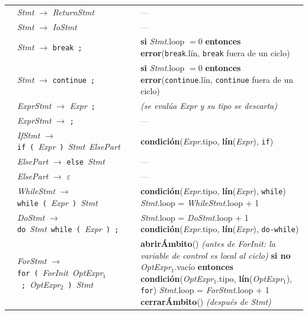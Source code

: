 \documentclass[11pt]{article}
\newcommand{\NT}[1]{\textcolor{ntcolor}{\textit{#1}}}            %
\newcommand{\T}[1]{\textcolor{tcolor}{\texttt{#1}}}              %
\newcommand{\A}[2]{\NT{#1}.\textsf{#2}}                          %
\newcommand{\Ax}[3]{\NT{#1}$_{#2}$.\textsf{#3}}                  %
\newcommand{\fn}[1]{\textsf{\textbf{#1}}}                        %
\newcommand{\kw}[1]{\textbf{#1}}                                 %
\begin{document}
{\begin{longtable}{@{}r@{\hspace{6pt}}>{\raggedright\arraybackslash}p{5.6cm}@{\hspace{8pt}}>{\raggedright\arraybackslash}p{9.9cm}@{}}
\addlinespace[2pt]
{(34)} & \NT{Stmt} $\rightarrow$ \NT{ReturnStmt} & \textcolor{gray}{---} \\
\addlinespace[2pt]
{(35)} & \NT{Stmt} $\rightarrow$ \NT{IoStmt} & \textcolor{gray}{---} \\
\addlinespace[2pt]
{(36)} & \NT{Stmt} $\rightarrow$ \T{break}\ \T{;} & \kw{si} \A{Stmt}{loop} $= 0$ \kw{entonces} \fn{error}(\T{break}.\textsf{lín}, \T{break} fuera de un ciclo) \\
\addlinespace[2pt]
{(37)} & \NT{Stmt} $\rightarrow$ \T{continue}\ \T{;} & \kw{si} \A{Stmt}{loop} $= 0$ \kw{entonces} \fn{error}(\T{continue}.\textsf{lín}, \T{continue} fuera de un ciclo) \\
\addlinespace[2pt]
{(38)} & \NT{ExprStmt} $\rightarrow$ \NT{Expr}\ \T{;} & \textit{(se evalúa \NT{Expr} y su tipo se descarta)} \\
\addlinespace[2pt]
{(39)} & \NT{ExprStmt} $\rightarrow$ \T{;} & \textcolor{gray}{---} \\
\addlinespace[2pt]
{(40)} & \NT{IfStmt} $\rightarrow$ \T{if}\ \T{(}\ \NT{Expr}\ \T{)}\ \NT{Stmt}\ \NT{ElsePart} & \fn{condición}(\A{Expr}{tipo}, \fn{lín}(\NT{Expr}), \T{if}) \\
\addlinespace[2pt]
{(41)} & \NT{ElsePart} $\rightarrow$ \T{else}\ \NT{Stmt} & \textcolor{gray}{---} \\
\addlinespace[2pt]
{(42)} & \NT{ElsePart} $\rightarrow$ $\varepsilon$ & \textcolor{gray}{---} \\
\addlinespace[2pt]
{(43)} & \NT{WhileStmt} $\rightarrow$ \T{while}\ \T{(}\ \NT{Expr}\ \T{)}\ \NT{Stmt} & \fn{condición}(\A{Expr}{tipo}, \fn{lín}(\NT{Expr}), \T{while}) \newline \A{Stmt}{loop} = \A{WhileStmt}{loop} + 1 \\
\addlinespace[2pt]
{(44)} & \NT{DoStmt} $\rightarrow$ \T{do}\ \NT{Stmt}\ \T{while}\ \T{(}\ \NT{Expr}\ \T{)}\ \T{;} & \A{Stmt}{loop} = \A{DoStmt}{loop} + 1 \newline \fn{condición}(\A{Expr}{tipo}, \fn{lín}(\NT{Expr}), \T{do-while}) \\
\addlinespace[2pt]
{(45)} & \NT{ForStmt} $\rightarrow$ \T{for}\ \T{(}\ \NT{ForInit}\ \NT{OptExpr}$_{1}$\ \T{;}\ \NT{OptExpr}$_{2}$\ \T{)}\ \NT{Stmt} & \fn{abrirÁmbito}() \quad\textit{(antes de \NT{ForInit}: la variable de control es local al ciclo)} \newline \kw{si no} \Ax{OptExpr}{1}{vacío} \kw{entonces} \fn{condición}(\Ax{OptExpr}{1}{tipo}, \fn{lín}(\NT{OptExpr}$_1$), \T{for}) \newline \A{Stmt}{loop} = \A{ForStmt}{loop} + 1 \newline \fn{cerrarÁmbito}() \quad\textit{(después de \NT{Stmt})} \\

\end{longtable}}
\end{document}
